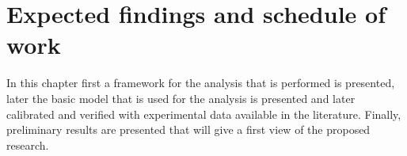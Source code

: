 \chapter{Expected findings and schedule of work}
In this chapter first a framework for the analysis that is performed is presented, later the basic model that is used for the analysis is presented and later calibrated and verified with experimental data available in the literature. Finally, preliminary results are presented that will give a first view of the proposed research.

